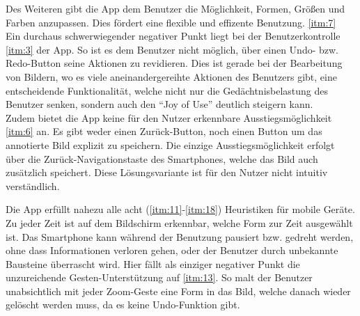 Des Weiteren gibt die App dem Benutzer die Möglichkeit, Formen, Größen und Farben anzupassen. Dies fördert eine flexible und effizente Benutzung. \ref{itm:7} \\

Ein durchaus schwerwiegender negativer Punkt liegt bei der Benutzerkontrolle \ref{itm:3} der App. So ist es dem Benutzer nicht möglich, über einen Undo- bzw. Redo-Button seine Aktionen zu revidieren. Dies ist gerade bei der Bearbeitung von Bildern, wo es viele aneinandergereihte Aktionen des Benutzers gibt, eine entscheidende Funktionalität, welche nicht nur die Gedächtnisbelastung des Benutzer senken, sondern auch den ``Joy of Use'' deutlich steigern kann. \\

Zudem bietet die App keine für den Nutzer erkennbare Ausstiegsmöglichkeit \ref{itm:6} an. Es gibt weder einen Zurück-Button, noch einen Button um das annotierte Bild explizit zu speichern. Die einzige Ausstiegsmöglichkeit erfolgt über die Zurück-Navigationstaste des Smartphones, welche das Bild auch zusätzlich speichert. Diese Lösungsvariante ist für den Nutzer nicht intuitiv verständlich. 

Die App erfüllt nahezu alle acht (\ref{itm:11}-\ref{itm:18}) Heuristiken für mobile Geräte. Zu jeder Zeit ist auf dem Bildschirm erkennbar, welche Form zur Zeit ausgewählt ist. Das Smartphone kann während der Benutzung pausiert bzw. gedreht werden, ohne dass Informationen verloren gehen, oder der Benutzer durch unbekannte Bausteine überrascht wird.  Hier fällt als einziger negativer Punkt die unzureichende Gesten-Unterstützung auf \ref{itm:13}. So malt der Benutzer unabsichtlich mit jeder Zoom-Geste eine Form in das Bild, welche danach wieder gelöscht werden muss, da es keine Undo-Funktion gibt. \\


